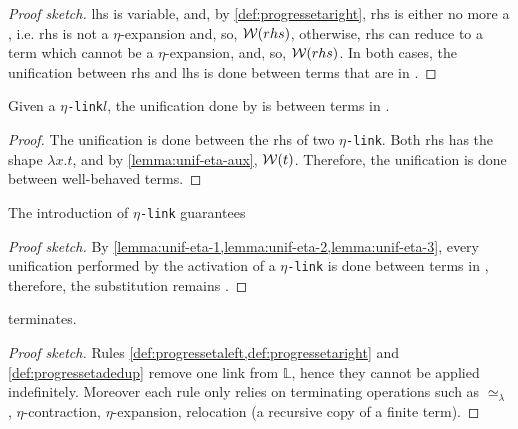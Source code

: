 \documentclass[sigconf,natbib=false,review]{acmart}
\newcommand{\UnifRel}{\ensuremath{\simeq}}
\newcommand{\Ue}{\ensuremath{\UnifRel_\lambda}\xspace}
\newcommand{\linkMacro}[1]{\ensuremath{#1}\texttt{-link}\xspace}
\newcommand{\linketa} {\linkMacro{\eta}}
\newcommand{\lhs}{lhs\xspace}
\newcommand{\rhs}{rhs\xspace}
\newcommand{\linkStore}{\texorpdfstring{\ensuremath{\mathbb{L}}\xspace}{L}}
\begin{document}
\begin{proof}[Proof sketch]
  \lhs is variable, and, by \cref{def:progressetaright}, \rhs is either no more
  a \maybeeta, i.e. \rhs is not a $\eta$-expansion and, so, $\wellb(\rhs)$,
  otherwise, \rhs can reduce to a term which cannot be a $\eta$-expansion, and,
  so, $\wellb(\rhs)$. In both cases, the unification between \rhs and \lhs
  is done between terms that are in \wellb.
\end{proof}

\begin{lemma}
  Given a \linketa $l$, the unification done by \progressetadedup is between
  terms in \wellb.
  \label{lemma:unif-eta-3}
\end{lemma}

\begin{proof}
  The unification is done between the \rhs of two \linketa. Both \rhs has the
  shape $\lambda x.t$, and by \cref{lemma:unif-eta-aux}, $\mathcal{W}(t)$.
  Therefore, the unification is done between well-behaved terms.
\end{proof}

\begin{lemma}
  The introduction of \linketa guarantees 
  \label{lemma:unif-wellb}
\end{lemma}

\begin{proof}[Proof sketch]
  By \cref{lemma:unif-eta-1,lemma:unif-eta-2,lemma:unif-eta-3}, every
  unification performed by the activation of a \linketa is done between
  terms in \wellb, therefore, the substitution remains \wellb.
\end{proof}

\begin{lemma}
   terminates.
  \label{lemma:prog-eta-terminates}
\end{lemma}

\begin{proof}[Proof sketch]
  Rules \cref{def:progressetaleft,def:progressetaright} and
  \cref{def:progressetadedup} remove one link from \linkStore, hence they
  cannot be applied indefinitely.
  Moreover each rule only relies on terminating operations such as \Ue,
  $\eta$-contraction, $\eta$-expansion, relocation (a recursive copy of a
  finite term).
\end{proof}
\end{document}
